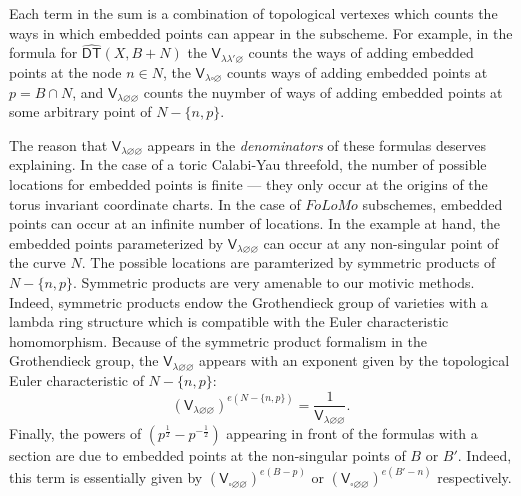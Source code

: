 \documentclass[12pt]{amsart}
\newcommand{\Vsf}{\mathsf{V}}
\newcommand{\bx}{\square}
\renewcommand{\emptyset}{\varnothing}
\newcommand{\half}{\frac{1}{2}}
\theoremstyle{definition}
\newcommand{\DThat}{\operatorname{\widehat{\mathsf{DT}}}}
\newcommand{\folomo}{{FoLoMo }}
\begin{document}
Each term in the sum is a combination of topological vertexes which
counts the ways in which embedded points can appear in the
subscheme. For example, in the formula for $\DThat (X,B+N)$ the
$\Vsf_{\lambda \lambda '\emptyset}$ counts the ways of adding embedded
points at the node $n\in N$, the $\Vsf_{\lambda \bx \emptyset}$ counts
ways of adding embedded points at $p=B\cap N$, and $\Vsf_{\lambda
\emptyset \emptyset}$ counts the nuymber of ways of adding embedded
points at some arbitrary point of $N-\{n,p \}$. 

The reason that $\Vsf_{\lambda \emptyset \emptyset}$ appears in the
\emph{denominators} of these formulas deserves explaining.  In the
case of a toric Calabi-Yau threefold, the number of possible locations
for embedded points is finite --- they only occur at the origins of
the torus invariant coordinate charts. In the case of $\folomo$
subschemes, embedded points can occur at an infinite number of
locations. In the example at hand, the embedded points parameterized
by $\Vsf_{\lambda \emptyset \emptyset}$ can occur at any non-singular
point of the curve $N$. The possible locations are paramterized by
symmetric products of $N-\{n,p \}$.  Symmetric products are very
amenable to our motivic methods. Indeed, symmetric products endow the
Grothendieck group of varieties with a lambda ring structure which is
compatible with the Euler characteristic homomorphism. Because of the symmetric product
formalism in the Grothendieck group, the $\Vsf_{\lambda \emptyset \emptyset}$ appears with an
exponent given by the topological Euler characteristic of $N-\{n,p \}$:
\[
(\Vsf_{\lambda \emptyset \emptyset})^{e(N-\{n,p \})}
=\frac{1}{\Vsf_{\lambda \emptyset \emptyset}} .
\]
Finally, the powers of $\left(p^{\half}-p^{-\half} \right)$ appearing
in front of the formulas with a section are due to embedded points at
the non-singular points of $B$ or $B'$. Indeed, this term is
essentially given by $\left(\Vsf_{\bx \emptyset \emptyset}
\right)^{e(B-p)}$ or $\left(\Vsf_{\bx \emptyset \emptyset}
\right)^{e(B'-n)}$ respectively.
\end{document}
